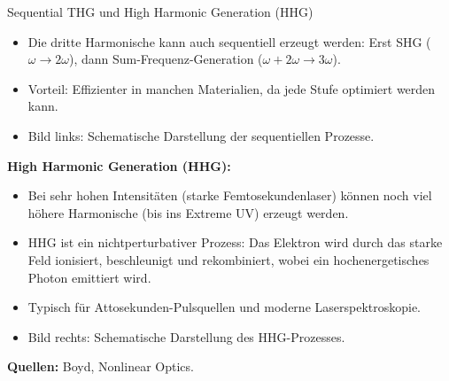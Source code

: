 \documentclass[aspectratio=169]{beamer} %
\begin{document}
\begin{frame}[noframenumbering]{Sequential THG und High Harmonic Generation (HHG)}
{\begin{itemize}
      \item Die dritte Harmonische kann auch sequentiell erzeugt werden: Erst SHG ($\omega \rightarrow 2\omega$), dann Sum-Frequenz-Generation ($\omega + 2\omega \rightarrow 3\omega$).
      \item Vorteil: Effizienter in manchen Materialien, da jede Stufe optimiert werden kann.
      \item Bild links: Schematische Darstellung der sequentiellen Prozesse.
    \end{itemize}
    \textbf{High Harmonic Generation (HHG):}
    \begin{itemize}
      \item Bei sehr hohen Intensitäten (starke Femtosekundenlaser) können noch viel höhere Harmonische (bis ins Extreme UV) erzeugt werden.
      \item HHG ist ein nichtperturbativer Prozess: Das Elektron wird durch das starke Feld ionisiert, beschleunigt und rekombiniert, wobei ein hochenergetisches Photon emittiert wird.
      \item Typisch für Attosekunden-Pulsquellen und moderne Laserspektroskopie.
      \item Bild rechts: Schematische Darstellung des HHG-Prozesses.
    \end{itemize}
    \textbf{Quellen:} Boyd, Nonlinear Optics.
  }
\end{frame}

\end{document}
